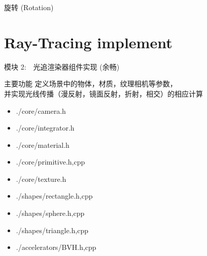 \documentclass{beamer}
\begin{document}
\begin{frame} {旋转 (Rotation)}
\begin{itemize}
\end{itemize}
\end{frame}

\section{Ray-Tracing implement}
\begin{frame} {模块 2:　光追渲染器组件实现 (余畅) }
\begin{block}{主要功能}
    定义场景中的物体，材质，纹理相机等参数，\\ 并实现光线传播（漫反射，镜面反射，折射，相交）的相应计算
  \end{block}
\begin{itemize}
			\item \begin{semiverbatim}
    ./core/camera.h
  \end{semiverbatim}
			\item \begin{semiverbatim}
    ./core/integrator.h
  \end{semiverbatim}
			\item \begin{semiverbatim}
    ./core/material.h
  \end{semiverbatim}
\item \begin{semiverbatim}
    ./core/primitive.h,cpp
  \end{semiverbatim}
\item \begin{semiverbatim}
    ./core/texture.h
  \end{semiverbatim}
\item \begin{semiverbatim}
    ./shapes/rectangle.h,cpp
  \end{semiverbatim}
\item \begin{semiverbatim}
    ./shapes/sphere.h,cpp
  \end{semiverbatim}
\item \begin{semiverbatim}
     ./shapes/triangle.h,cpp
  \end{semiverbatim}
\item \begin{semiverbatim}
    ./accelerators/BVH.h,cpp
  \end{semiverbatim}
\end{itemize}
\end{frame}
\end{document}
